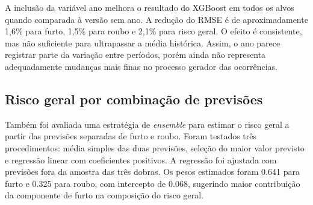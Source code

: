 \documentclass[12pt]{article}
\begin{document}
\begin{table}[!htbp]
\centering
\caption{Métricas médias da validação cruzada temporal do XGBoost}
\label{tab:xgb_cv}
\scriptsize
\renewcommand{\arraystretch}{1.15}
\end{table}

A inclusão da variável ano melhora o resultado do XGBoost em todos os alvos quando comparada à versão sem ano. A redução do RMSE é de aproximadamente 1,6\% para furto, 1,5\% para roubo e 2,1\% para risco geral. O efeito é consistente, mas não suficiente para ultrapassar a média histórica. Assim, o ano parece registrar parte da variação entre períodos, porém ainda não representa adequadamente mudanças mais finas no processo gerador das ocorrências.

\subsection{Risco geral por combinação de previsões}

Também foi avaliada uma estratégia de \textit{ensemble} para estimar o risco geral a partir das previsões separadas de furto e roubo. Foram testados três procedimentos: média simples das duas previsões, seleção do maior valor previsto e regressão linear com coeficientes positivos. A regressão foi ajustada com previsões fora da amostra das três dobras. Os pesos estimados foram 0.641 para furto e 0.325 para roubo, com intercepto de 0.068, sugerindo maior contribuição da componente de furto na composição do risco geral.
\end{document}
